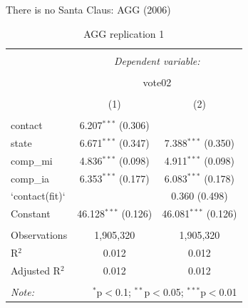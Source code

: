\documentclass[
  ignorenonframetext,
]{beamer}
\newenvironment{Shaded}{\begin{snugshade}}{\end{snugshade}}
\newcommand{\DataTypeTok}[1]{\textcolor[rgb]{0.13,0.29,0.53}{#1}}
\newcommand{\KeywordTok}[1]{\textcolor[rgb]{0.13,0.29,0.53}{\textbf{#1}}}
\newcommand{\NormalTok}[1]{#1}
\newcommand{\OperatorTok}[1]{\textcolor[rgb]{0.81,0.36,0.00}{\textbf{#1}}}
\newcommand{\OtherTok}[1]{\textcolor[rgb]{0.56,0.35,0.01}{#1}}
\newcommand{\StringTok}[1]{\textcolor[rgb]{0.31,0.60,0.02}{#1}}
\begin{document}
\begin{frame}[fragile]{There is no Santa Claus: AGG (2006)}
\protect\hypertarget{there-is-no-santa-claus-agg-2006-2}{}
\tiny

\begin{Shaded}
\end{Shaded}

\begin{table}[!htbp] \centering 
  \caption{AGG replication 1} 
  \label{} 
\begin{tabular}{@{\extracolsep{5pt}}lcc} 
\\[-1.8ex]\hline 
\hline \\[-1.8ex] 
 & \multicolumn{2}{c}{\textit{Dependent variable:}} \\ 
\cline{2-3} 
\\[-1.8ex] & \multicolumn{2}{c}{vote02} \\ 
\\[-1.8ex] & (1) & (2)\\ 
\hline \\[-1.8ex] 
 contact & 6.207$^{***}$ (0.306) &  \\ 
  state & 6.671$^{***}$ (0.347) & 7.388$^{***}$ (0.350) \\ 
  comp\_mi & 4.836$^{***}$ (0.098) & 4.911$^{***}$ (0.098) \\ 
  comp\_ia & 6.353$^{***}$ (0.177) & 6.083$^{***}$ (0.178) \\ 
  `contact(fit)` &  & 0.360 (0.498) \\ 
  Constant & 46.128$^{***}$ (0.126) & 46.081$^{***}$ (0.126) \\ 
 \hline \\[-1.8ex] 
Observations & 1,905,320 & 1,905,320 \\ 
R$^{2}$ & 0.012 & 0.012 \\ 
Adjusted R$^{2}$ & 0.012 & 0.012 \\ 
\hline 
\hline \\[-1.8ex] 
\textit{Note:}  & \multicolumn{2}{r}{$^{*}$p$<$0.1; $^{**}$p$<$0.05; $^{***}$p$<$0.01} \\ 
\end{tabular} 
\end{table}
\end{frame}
\end{document}
